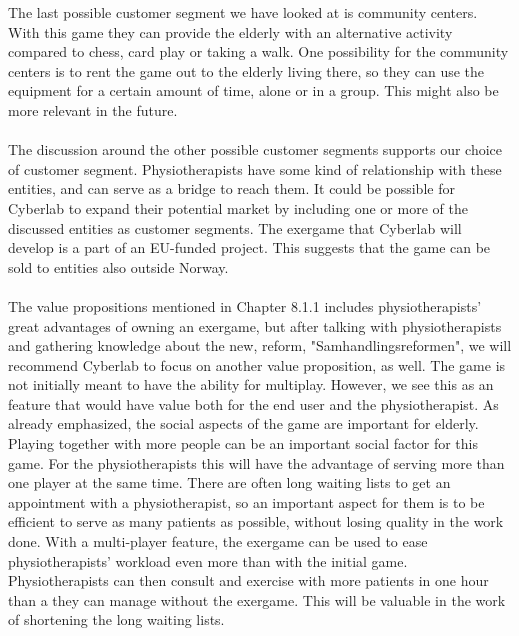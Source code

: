 The last possible customer segment we have looked at is community centers. With this game they can provide the elderly with an alternative activity compared to chess, card play or taking a walk. One possibility for the community centers is to rent the game out to the elderly living there, so they can use the equipment for a certain amount of time, alone or in a group. This might also be more relevant in the future. \\ \\
The discussion around the other possible customer segments supports our choice of customer segment. Physiotherapists have some kind of relationship with these entities, and can serve as a bridge to reach them. It could be possible for Cyberlab to expand their potential market by including one or more of the discussed entities as customer segments. The exergame that Cyberlab will develop is a part of an EU-funded project. This suggests that the game can be sold to entities also outside Norway.  \\ \\
The value propositions mentioned in Chapter 8.1.1 includes physiotherapists' great advantages of owning an exergame, but after talking with physiotherapists and gathering knowledge about the new, reform, "Samhandlingsreformen", we will recommend Cyberlab to focus on another value proposition, as well. The game is not initially meant to have the ability for multiplay. However, we see this as an feature that would have value both for the end user and the physiotherapist. As already emphasized, the social aspects of the game are important for elderly. Playing together with more people can be an important social factor for this game. For the physiotherapists this will have the advantage of serving more than one player at the same time. There are often long waiting lists to get an appointment with a physiotherapist, so an important aspect for them is to be efficient to serve as many patients as possible, without losing quality in the work done. With a multi-player feature, the exergame can be used to ease physiotherapists' workload even more than with the initial game. Physiotherapists can then consult and exercise with more patients in one hour than a they can manage without the exergame. This will be valuable in the work of shortening the long waiting lists. \\ \\
